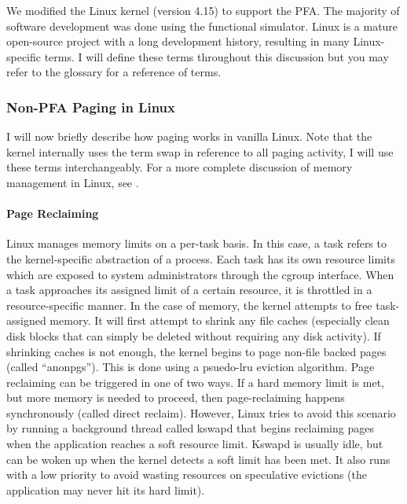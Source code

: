 
We modified the Linux kernel (version 4.15\cite{linux}) to support the PFA. The
majority of software development was done using the functional simulator. Linux
is a mature open-source project with a long development history, resulting in
many Linux-specific terms. I will define these terms throughout this discussion
but you may refer to the glossary for a reference of terms.

\subsubsection{Non-PFA Paging in Linux} \label{sec:vanillaLinux}
I will now briefly describe how paging works in vanilla Linux. Note that the
kernel internally uses the term \gls{swap} in reference to all paging activity,
I will use these terms interchangeably. For a more complete discussion of
memory management in Linux, see \cite{linuxBook}.

\paragraph{Page Reclaiming}
Linux manages memory limits on a per-task basis. In this case, a \gls{task}
refers to the kernel-specific abstraction of a process. Each task has its own
resource limits which are exposed to system administrators through the
\gls{cgroup} interface. When a task approaches its assigned limit of a certain
resource, it is throttled in a resource-specific manner. In the case of memory,
the kernel attempts to free task-assigned memory. It will first attempt to
shrink any file caches (especially clean disk blocks that can simply be deleted
without requiring any disk activity). If shrinking caches is not enough, the
kernel begins to page non-file backed pages (called ``\glspl{anonpg}''). This
is done using a psuedo-lru eviction algorithm. Page reclaiming can be triggered
in one of two ways. If a hard memory limit is met, but more memory is needed to
proceed, then page-reclaiming happens synchronously (called direct reclaim).
However, Linux tries to avoid this scenario by running a background thread
called \gls{kswapd} that begins reclaiming pages when the application reaches a
soft resource limit. Kswapd is usually idle, but can be woken up when the
kernel detects a soft limit has been met. It also runs with a low priority to
avoid wasting resources on speculative evictions (the application may never hit
its hard limit).

